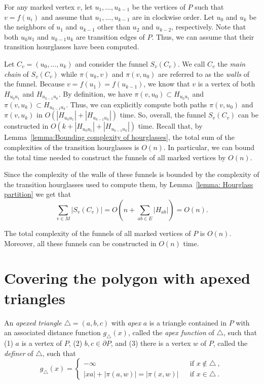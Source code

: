 \documentclass[a4paper,UKenglish]{lipics}
\newcommand{\fn}[2]{\ensuremath{S_{\scriptscriptstyle #1}(#2)}}
\newcommand{\ff}[1]{\ensuremath{f(#1)}}
\newcommand{\g}[2]{\ensuremath{|\pi(#1, #2)|}}
\newcommand{\p}[2]{\ensuremath{\pi(#1, #2)}}
\begin{document}
For any marked vertex $v$, let $u_1, \ldots, u_{k-1}$ be the vertices of $P$ such that $v = \ff{u_i}$ and assume that $u_1, \ldots, u_{k-1}$ are in clockwise order. Let $u_0$ and $u_k$ be the neighbors of $u_1$ and $u_{k-1}$ other than $u_2$ and $u_{k-2}$, respectively. Note that both $u_0 u_1$ and $u_{k-1}u_k$ are transition edges of $P$. Thus, we can assume that their transition hourglasses have been computed.

Let $C_v = (u_0, \ldots, u_k)$ and consider the funnel $\fn{v}{C_v}$.
We call $C_v$ the \emph{main chain} of $\fn{v}{C_v}$ while $\p{u_k}{ v}$ and $\p{v}{ u_0}$ are referred to as the \emph{walls} of the funnel.  
Because $v = \ff{u_1} = \ff{u_{k-1}}$, we know that $v$ is a vertex of both $H_{u_0 u_1}$ and  $H_{u_{k-1}u_k}$. 
By definition, we have $\p{v}{ u_0}\subset H_{u_0u_1}$ and $\p{v}{u_k}\subset H_{u_{k-1}u_k}$. Thus, we can explicitly compute both paths $\p{v}{ u_0}$ and $\p{v}{u_k}$ in $O( |H_{u_0 u_1}| + |H_{u_{k-1}u_k}|)$ time.
So, overall, the funnel $\fn{v}{C_v}$ can be constructed in $O(k + |H_{u_0 u_1}| + |H_{u_{k-1}u_k}|)$ time. 
Recall that, by Lemma~\ref{lemma:Bounding complexity of hourglasses}, the total sum of the complexities of the transition hourglasses is $O(n)$. In particular, we can bound the total time needed to construct the funnels of all marked vertices by $O(n)$. 

Since the complexity of the walls of these funnels is bounded by the complexity of the transition hourglasses used to compute them, by Lemma~\ref{lemma: Hourglass partition} we get that $$\sum_{v\in M} |\fn{v}{C_v}|  = O\left(n + \sum_{ab\in E} |H_{ab}|\right) = O(n).$$

\begin{lemma}\label{lemma: Marked vertices funnels construction}
The total complexity of the funnels of all marked vertices of $P$ is $O(n)$. 
Moreover, all these funnels can be constructed in $O(n)$ time.
\end{lemma}

\section{Covering the polygon with apexed triangles}\label{Section:Computing apexed triangles}
An \emph{apexed triangle} $\triangle = (a,b,c)$ with \emph{apex} $a$ is a triangle contained in $P$ with an associated distance function $g_\triangle(x)$, called the \emph{apex function} of $\triangle$, such that (1) $a$ is a vertex of $P$, (2) $b,c \in\partial P$, and (3) there is a  vertex $w$ of  $P$, called the \emph{definer} of $\triangle$, such that
$$g_\triangle(x) = \left\{ \begin{array}{lll}
-\infty&&\text{if $x\notin \triangle$}\ ,\\
|xa| + \g{a}{w} = \g{x}{w} && \text{if $x\in \triangle$}\ .
\end{array}\right.$$
\end{document}
